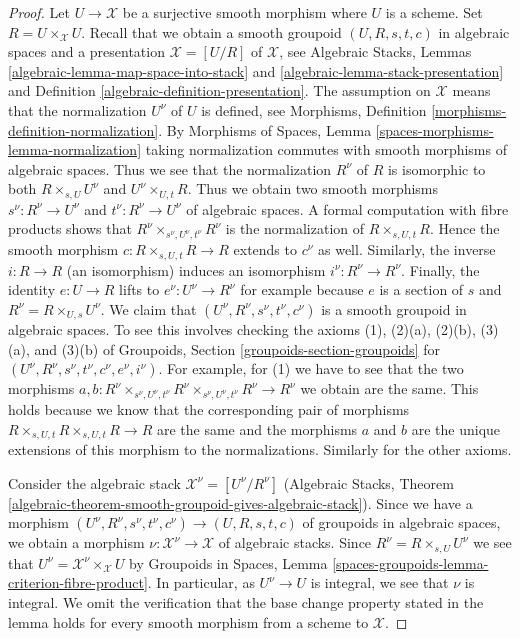 \documentclass[10pt,a4paper]{amsart}
\theoremstyle{plain}
\theoremstyle{definition}
\theoremstyle{remark}
\numberwithin{equation}{subsection}
\begin{document}
\begin{proof}
Let $U \to \mathcal{X}$ be a surjective smooth morphism where $U$ is a scheme.
Set $R = U \times_\mathcal{X} U$. Recall that we obtain a smooth groupoid
$(U, R, s, t, c)$ in algebraic spaces and a presentation
$\mathcal{X} = [U/R]$ of $\mathcal{X}$, see Algebraic Stacks,
Lemmas \ref{algebraic-lemma-map-space-into-stack} and
\ref{algebraic-lemma-stack-presentation} and
Definition \ref{algebraic-definition-presentation}.
The assumption on $\mathcal{X}$ means that the normalization
$U^\nu$ of $U$ is defined, see Morphisms, Definition
\ref{morphisms-definition-normalization}.
By Morphisms of Spaces, Lemma
\ref{spaces-morphisms-lemma-normalization}
taking normalization commutes with smooth morphisms of algebraic spaces.
Thus we see that the normalization $R^\nu$ of $R$
is isomorphic to both $R \times_{s, U} U^\nu$ and $U^\nu \times_{U, t} R$.
Thus we obtain two smooth morphisms
$s^\nu : R^\nu \to U^\nu$ and $t^\nu : R^\nu \to U^\nu$
of algebraic spaces. A formal computation with fibre products shows that
$R^\nu \times_{s^\nu, U^\nu, t^\nu} R^\nu$ is the normalization
of $R \times_{s, U, t} R$. Hence the smooth morphism
$c : R \times_{s, U, t} R \to R$ extends to $c^\nu$ as well.
Similarly, the inverse $i : R \to R$ (an isomorphism) induces
an isomorphism $i^\nu : R^\nu \to R^\nu$. Finally, the identity
$e : U \to R$ lifts to $e^\nu : U^\nu \to R^\nu$ for example
because $e$ is a section of $s$ and $R^\nu = R \times_{U, s} U^\nu$.
We claim that $(U^\nu, R^\nu, s^\nu, t^\nu, c^\nu)$ is
a smooth groupoid in algebraic spaces. To see this involves checking
the axioms (1), (2)(a), (2)(b), (3)(a), and (3)(b) of
Groupoids, Section \ref{groupoids-section-groupoids}
for $(U^\nu, R^\nu, s^\nu, t^\nu, c^\nu, e^\nu, i^\nu)$.
For example, for (1) we have to see that the two morphisms
$a, b : R^\nu \times_{s^\nu, U^\nu, t^\nu} R^\nu
\times_{s^\nu, U^\nu, t^\nu} R^\nu \to R^\nu$ we obtain are the same.
This holds because we know that the corresponding pair of morphisms
$R \times_{s, U, t} R \times_{s, U, t} R \to R$
are the same and the morphisms $a$ and $b$ are the unique extensions
of this morphism to the normalizations. Similarly for the other
axioms.

\medskip\noindent
Consider the algebraic stack $\mathcal{X}^\nu = [U^\nu/R^\nu]$
(Algebraic Stacks, Theorem
\ref{algebraic-theorem-smooth-groupoid-gives-algebraic-stack}).
Since we have a morphism
$(U^\nu, R^\nu, s^\nu, t^\nu, c^\nu) \to (U, R, s, t, c)$
of groupoids in algebraic spaces, we obtain a morphism
$\nu : \mathcal{X}^\nu \to \mathcal{X}$ of algebraic stacks.
Since $R^\nu = R \times_{s, U} U^\nu$ we see that
$U^\nu = \mathcal{X}^\nu \times_\mathcal{X} U$ by
Groupoids in Spaces, Lemma
\ref{spaces-groupoids-lemma-criterion-fibre-product}.
In particular, as $U^\nu \to U$ is integral, we see that $\nu$ is integral.
We omit the verification that the base change property
stated in the lemma holds for every smooth morphism from a scheme to
$\mathcal{X}$.
\end{proof}
\end{document}
